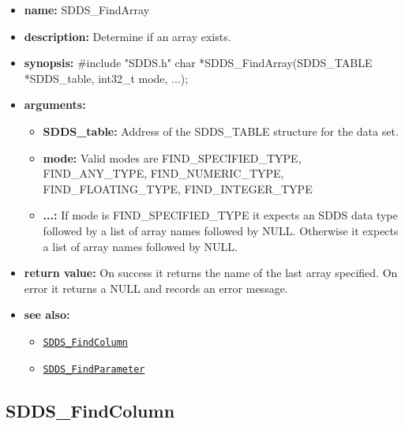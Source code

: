 \documentclass[11pt]{article}
\newcommand{\progref}[1]{\hyperref[SDDS_#1]{\tt SDDS\_#1}}
\begin{document}
\begin{itemize}
\item {\bf name:}\newline
SDDS\_FindArray
\item {\bf description:}\newline
Determine if an array exists.
\item {\bf synopsis:} \#include "SDDS.h"\newline
char *SDDS\_FindArray(SDDS\_TABLE *SDDS\_table, int32\_t mode, ...);
\item {\bf arguments:}
\begin{itemize}
\item {\bf SDDS\_table:} Address of the SDDS\_TABLE structure for the data set.
\item {\bf mode:} Valid modes are FIND\_SPECIFIED\_TYPE, FIND\_ANY\_TYPE, FIND\_NUMERIC\_TYPE, FIND\_FLOATING\_TYPE, FIND\_INTEGER\_TYPE
\item {\bf ...:} If mode is FIND\_SPECIFIED\_TYPE it expects an SDDS data type followed by a list of array names followed by NULL. Otherwise it expects a list of array names followed by NULL.
\end{itemize}
\item {\bf return value:}\newline
On success it returns the name of the last array specified. On error it returns a NULL and records an error message.
\item {\bf see also:}
\begin{itemize}
\item \progref{FindColumn}
\item \progref{FindParameter}
\end{itemize}
\end{itemize}

\subsection{SDDS\_FindColumn}
\label{SDDS_FindColumn}
\end{document}
